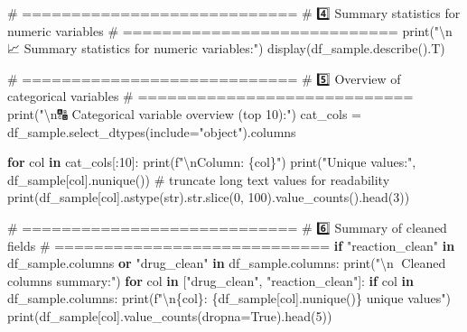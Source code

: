 \documentclass[
  letterpaper,
  DIV=11,
  numbers=noendperiod]{scrartcl}
\newenvironment{Shaded}{\begin{snugshade}}{\end{snugshade}}
\newcommand{\BuiltInTok}[1]{\textcolor[rgb]{0.00,0.23,0.31}{#1}}
\newcommand{\CharTok}[1]{\textcolor[rgb]{0.13,0.47,0.30}{#1}}
\newcommand{\CommentTok}[1]{\textcolor[rgb]{0.37,0.37,0.37}{#1}}
\newcommand{\ControlFlowTok}[1]{\textcolor[rgb]{0.00,0.23,0.31}{\textbf{#1}}}
\newcommand{\DecValTok}[1]{\textcolor[rgb]{0.68,0.00,0.00}{#1}}
\newcommand{\KeywordTok}[1]{\textcolor[rgb]{0.00,0.23,0.31}{\textbf{#1}}}
\newcommand{\NormalTok}[1]{\textcolor[rgb]{0.00,0.23,0.31}{#1}}
\newcommand{\OperatorTok}[1]{\textcolor[rgb]{0.37,0.37,0.37}{#1}}
\newcommand{\SpecialCharTok}[1]{\textcolor[rgb]{0.37,0.37,0.37}{#1}}
\newcommand{\SpecialStringTok}[1]{\textcolor[rgb]{0.13,0.47,0.30}{#1}}
\newcommand{\StringTok}[1]{\textcolor[rgb]{0.13,0.47,0.30}{#1}}
\newcommand{\VariableTok}[1]{\textcolor[rgb]{0.07,0.07,0.07}{#1}}
\begin{document}
\begin{Shaded}
\begin{Highlighting}[]
\CommentTok{\# ============================}
\CommentTok{\# 4️⃣ Summary statistics for numeric variables}
\CommentTok{\# ============================}
\BuiltInTok{print}\NormalTok{(}\StringTok{"}\CharTok{\textbackslash{}n}\StringTok{📈 Summary statistics for numeric variables:"}\NormalTok{)}
\NormalTok{display(df\_sample.describe().T)}

\CommentTok{\# ============================}
\CommentTok{\# 5️⃣ Overview of categorical variables}
\CommentTok{\# ============================}
\BuiltInTok{print}\NormalTok{(}\StringTok{"}\CharTok{\textbackslash{}n}\StringTok{🔠 Categorical variable overview (top 10):"}\NormalTok{)}
\NormalTok{cat\_cols }\OperatorTok{=}\NormalTok{ df\_sample.select\_dtypes(include}\OperatorTok{=}\StringTok{"object"}\NormalTok{).columns}

\ControlFlowTok{for}\NormalTok{ col }\KeywordTok{in}\NormalTok{ cat\_cols[:}\DecValTok{10}\NormalTok{]:}
    \BuiltInTok{print}\NormalTok{(}\SpecialStringTok{f"}\CharTok{\textbackslash{}n}\SpecialStringTok{Column: }\SpecialCharTok{\{}\NormalTok{col}\SpecialCharTok{\}}\SpecialStringTok{"}\NormalTok{)}
    \BuiltInTok{print}\NormalTok{(}\StringTok{"Unique values:"}\NormalTok{, df\_sample[col].nunique())}
    \CommentTok{\# truncate long text values for readability}
    \BuiltInTok{print}\NormalTok{(df\_sample[col].astype(}\BuiltInTok{str}\NormalTok{).}\BuiltInTok{str}\NormalTok{.}\BuiltInTok{slice}\NormalTok{(}\DecValTok{0}\NormalTok{, }\DecValTok{100}\NormalTok{).value\_counts().head(}\DecValTok{3}\NormalTok{))}

\CommentTok{\# ============================}
\CommentTok{\# 6️⃣ Summary of cleaned fields}
\CommentTok{\# ============================}
\ControlFlowTok{if} \StringTok{"reaction\_clean"} \KeywordTok{in}\NormalTok{ df\_sample.columns }\KeywordTok{or} \StringTok{"drug\_clean"} \KeywordTok{in}\NormalTok{ df\_sample.columns:}
    \BuiltInTok{print}\NormalTok{(}\StringTok{"}\CharTok{\textbackslash{}n}\StringTok{🧪 Cleaned columns summary:"}\NormalTok{)}
    \ControlFlowTok{for}\NormalTok{ col }\KeywordTok{in}\NormalTok{ [}\StringTok{"drug\_clean"}\NormalTok{, }\StringTok{"reaction\_clean"}\NormalTok{]:}
        \ControlFlowTok{if}\NormalTok{ col }\KeywordTok{in}\NormalTok{ df\_sample.columns:}
            \BuiltInTok{print}\NormalTok{(}\SpecialStringTok{f"}\CharTok{\textbackslash{}n}\SpecialCharTok{\{}\NormalTok{col}\SpecialCharTok{\}}\SpecialStringTok{: }\SpecialCharTok{\{}\NormalTok{df\_sample[col]}\SpecialCharTok{.}\NormalTok{nunique()}\SpecialCharTok{\}}\SpecialStringTok{ unique values"}\NormalTok{)}
            \BuiltInTok{print}\NormalTok{(df\_sample[col].value\_counts(dropna}\OperatorTok{=}\VariableTok{True}\NormalTok{).head(}\DecValTok{5}\NormalTok{))}
\end{Highlighting}
\end{Shaded}
\end{document}

